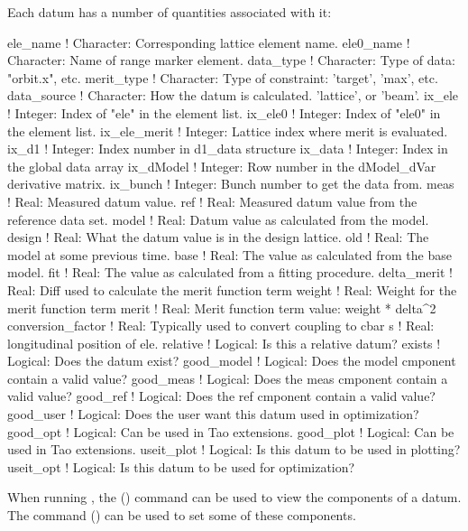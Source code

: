 Each datum has a number of quantities associated with it:
\begin{example}
  ele_name       ! Character: Corresponding lattice element name.
  ele0_name      ! Character: Name of range marker element.
  data_type      ! Character: Type of data: "orbit.x", etc.
  merit_type     ! Character: Type of constraint: 'target', 'max', etc.
  data_source    ! Character: How the datum is calculated. 'lattice', or 'beam'.
  ix_ele            ! Integer: Index of "ele" in the element list.
  ix_ele0           ! Integer: Index of "ele0" in the element list.
  ix_ele_merit      ! Integer: Lattice index where merit is evaluated.
  ix_d1             ! Integer: Index number in d1_data structure
  ix_data           ! Integer: Index in the global data array
  ix_dModel         ! Integer: Row number in the dModel_dVar derivative matrix.
  ix_bunch          ! Integer: Bunch number to get the data from.
  meas              ! Real: Measured datum value. 
  ref               ! Real: Measured datum value from the reference data set.
  model             ! Real: Datum value as calculated from the model.
  design            ! Real: What the datum value is in the design lattice.
  old               ! Real: The model at some previous time.
  base              ! Real: The value as calculated from the base model.
  fit               ! Real: The value as calculated from a fitting procedure.
  delta_merit       ! Real: Diff used to calculate the merit function term 
  weight            ! Real: Weight for the merit function term
  merit             ! Real: Merit function term value: weight * delta^2
  conversion_factor ! Real: Typically used to convert coupling to cbar
  s                 ! Real: longitudinal position of ele.
  relative          ! Logical: Is this a relative datum?
  exists            ! Logical: Does the datum exist?
  good_model        ! Logical: Does the model cmponent contain a valid value?
  good_meas         ! Logical: Does the meas cmponent contain a valid value?
  good_ref          ! Logical: Does the ref cmponent contain a valid value?
  good_user         ! Logical: Does the user want this datum used in optimization?
  good_opt          ! Logical: Can be used in Tao extensions.
  good_plot         ! Logical: Can be used in Tao extensions.
  useit_plot        ! Logical: Is this datum to be used in plotting?
  useit_opt         ! Logical: Is this datum to be used for optimization?
\end{example}
When running \tao, the 
() command can be used to view the components of a datum. 
The  command () can be used to set some of these components.


